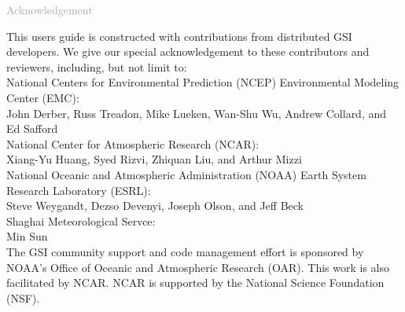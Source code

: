 \begin{titlepage}
\vspace*{0.5cm}
\noindent

\begin{flushleft}
\textcolor{darkgray}{\LARGE Acknowledgement}
\vspace*{1cm}\par

This user\textquotesingle s guide is constructed with contributions from distributed GSI developers. We give our special acknowledgement to these contributors and reviewers, including, but not limit to:  \\

National Centers for Environmental Prediction (NCEP) Environmental Modeling Center (EMC):  \\
John Derber, Russ Treadon, Mike Lueken, Wan-Shu Wu, Andrew Collard, and Ed Safford  \\

National Center for Atmospheric Research (NCAR):  \\
Xiang-Yu Huang, Syed Rizvi, Zhiquan Liu, and Arthur Mizzi  \\

National Oceanic and Atmospheric Administration (NOAA) Earth System Research Laboratory (ESRL):  \\
Steve Weygandt, Dezso Devenyi, Joseph Olson, and Jeff Beck \\

Shaghai Meteorological Servce: \\
Min Sun  \\


The GSI community support and code management effort is sponsored by NOAA's Office of Oceanic and Atmospheric Research (OAR). This work is also facilitated by NCAR. NCAR is supported by the National Science Foundation (NSF).

\end{flushleft}
\end{titlepage}
\pagebreak{}




